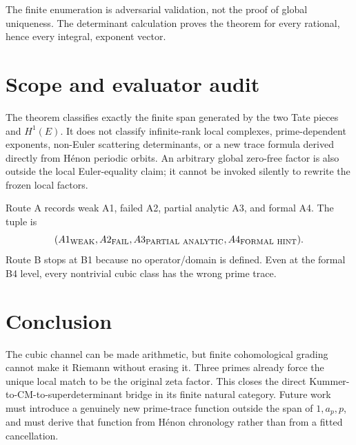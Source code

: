 \documentclass[11pt]{article}
\theoremstyle{remark}\newtheorem{remark}[theorem]{Remark}
\begin{document}
The finite enumeration is adversarial validation, not the proof of global
uniqueness.  The determinant calculation proves the theorem for every
rational, hence every integral, exponent vector.

\section{Scope and evaluator audit}
The theorem classifies exactly the finite span generated by the two Tate
pieces and \(H^1(E)\).  It does not classify infinite-rank local complexes,
prime-dependent exponents, non-Euler scattering determinants, or a new trace
formula derived directly from H\'enon periodic orbits.  An arbitrary global
zero-free factor is also outside the local Euler-equality claim; it cannot be
invoked silently to rewrite the frozen local factors.

Route A records weak A1, failed A2, partial analytic A3, and formal A4.  The
tuple is
\[
(A1_{\rm WEAK},A2_{\rm FAIL},A3_{\rm PARTIAL\ ANALYTIC},A4_{\rm FORMAL\ HINT}).
\]
Route B stops at B1 because no operator/domain is defined.  Even at the
formal B4 level, every nontrivial cubic class has the wrong prime trace.

\section{Conclusion}
The cubic channel can be made arithmetic, but finite cohomological grading
cannot make it Riemann without erasing it.  Three primes already force the
unique local match to be the original zeta factor.  This closes the direct
Kummer-to-CM-to-superdeterminant bridge in its finite natural category.
Future work must introduce a genuinely new prime-trace function outside the
span of \(1,a_p,p\), and must derive that function from H\'enon chronology
rather than from a fitted cancellation.


\end{document}
